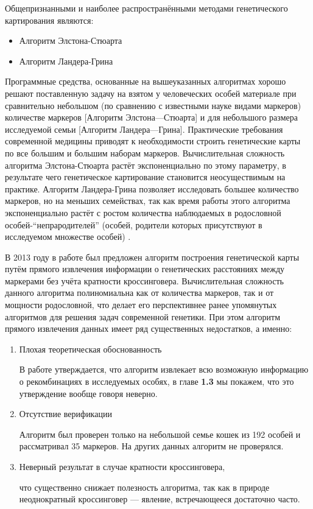 \documentclass{matmex-diploma-custom}
\begin{document}
Общепризнанными \cite{kruglyak1996parametric} и наиболее
распространёнными методами генетического картирования являются:
\begin{itemize}
\item Алгоритм Элстона-Стюарта
\item Алгоритм Ландера-Грина
\end{itemize}

Программные средства, основанные на вышеуказанных алгоритмах хорошо
решают поставленную задачу на взятом у человеческих особей материале
при сравнительно небольшом (по сравнению с известными науке видами
маркеров) количестве маркеров [Алгоритм Элстона---Стюарта] и для
небольшого размера исследуемой семьи [Алгоритм
Ландера---Грина]. Практические требования современной медицины
приводят к необходимости строить генетические карты по все большим и
большим наборам маркеров. Вычислительная сложность алгоритма
Элстона-Стюарта растёт \cite{fishelson2002exact} экспоненциально по
этому параметру, в результате чего генетическое картирование
становится неосуществимым на практике. Алгоритм Ландера-Грина
позволяет исследовать большее количество маркеров, но на меньших
семействах, так как время работы этого алгоритма экспоненциально
растёт с ростом количества наблюдаемых в родословной
особей-``непрародителей'' (особей, родители которых присутствуют в
исследуемом множестве особей) \cite{fishelson2002exact}.

В 2013 году в работе \cite{sysoev} был предложен алгоритм построения
генетической карты путём прямого извлечения информации о генетических
расстояниях между маркерами без учёта кратности
кроссинговера. Вычислительная сложность данного алгоритма
полиномиальна как от количества маркеров, так и от мощности
родословной, что делает его перспективнее ранее упомянутых алгоритмов
для решения задач современной генетики. При этом алгоритм прямого
извлечения данных имеет ряд существенных недостатков, а именно:
\begin{enumerate}
\item Плохая теоретическая обоснованность

  В работе \cite{sysoev} утверждается, что алгоритм извлекает всю
  возможную информацию о рекомбинациях в исследуемых особях, в главе
  \textbf{1.3} мы покажем, что это утверждение вообще говоря неверно.

\item Отсутствие верификации

  Алгоритм был проверен только на небольшой семье кошек из 192 особей
  и рассматривал 35 маркеров. На других данных алгоритм не проверялся.

\item Неверный результат в случае кратности кроссинговера,

  что существенно снижает полезность алгоритма, так как в природе
  неоднократный кроссинговер --- явление, встречающееся достаточно
  часто.

\end{enumerate}
\end{document}
